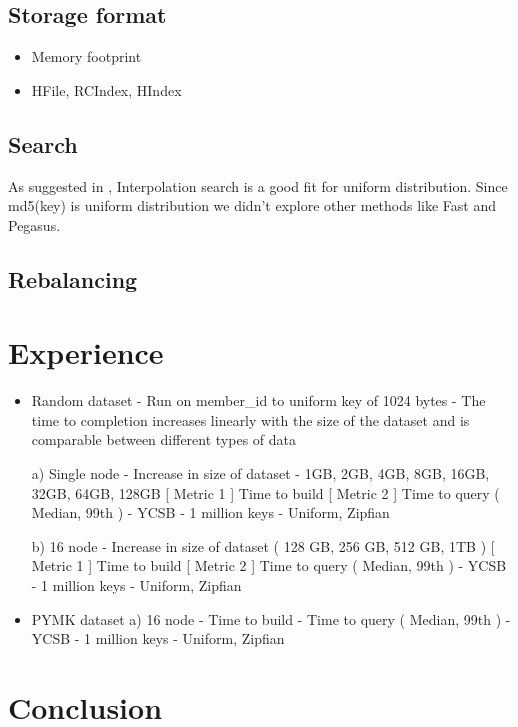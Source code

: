 \documentclass[10pt,twocolumn,preprint,natbib,authoryear]{sigplanconf}
\begin{document}
\subsection{Storage format}
\begin{itemize}
	\item Memory footprint
	\item HFile, RCIndex, HIndex
\end{itemize}

\subsection{Search}
As suggested in \cite{ An adaptation of a root finding method to searching ordered disk files}, Interpolation search is a good fit for uniform distribution. Since md5(key) is uniform distribution we didn't explore other methods like Fast and Pegasus. 

\subsection{Rebalancing}




\section{Experience}

\begin{itemize}
	\item Random dataset
- Run on member\_id to uniform key of 1024 bytes
- The time to completion increases linearly with the size of the dataset and is comparable between different types of data

a) Single node - Increase in size of dataset - 1GB, 2GB, 4GB, 8GB, 16GB, 32GB, 64GB, 128GB 
       [ Metric 1 ] Time to build
       [ Metric 2 ] Time to query ( Median, 99th ) - YCSB - 1 million keys - Uniform, Zipfian 

b) 16 node - Increase in size of dataset ( 128 GB, 256 GB, 512 GB, 1TB )
      [ Metric 1 ] Time to build
      [ Metric 2 ] Time to query ( Median, 99th ) - YCSB - 1 million keys - Uniform, Zipfian 

	\item PYMK dataset
a) 16 node 
       - Time to build
       - Time to query ( Median, 99th ) - YCSB - 1 million keys - Uniform, Zipfian 
\end{itemize}


\section{Conclusion}



\acks




    
\end{document}
